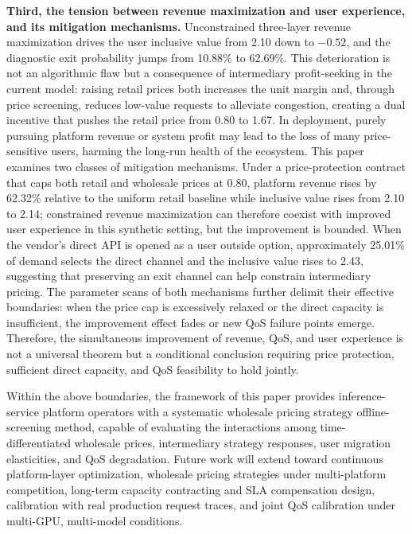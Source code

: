 \documentclass[11pt,a4paper]{article}
\begin{document}
\textbf{Third, the tension between revenue maximization and user experience, and its mitigation mechanisms.} Unconstrained three-layer revenue maximization drives the user inclusive value from 2.10 down to $-0.52$, and the diagnostic exit probability jumps from 10.88\% to 62.69\%. This deterioration is not an algorithmic flaw but a consequence of intermediary profit-seeking in the current model: raising retail prices both increases the unit margin and, through price screening, reduces low-value requests to alleviate congestion, creating a dual incentive that pushes the retail price from 0.80 to 1.67. In deployment, purely pursuing platform revenue or system profit may lead to the loss of many price-sensitive users, harming the long-run health of the ecosystem. This paper examines two classes of mitigation mechanisms. Under a price-protection contract that caps both retail and wholesale prices at 0.80, platform revenue rises by 62.32\% relative to the uniform retail baseline while inclusive value rises from 2.10 to 2.14; constrained revenue maximization can therefore coexist with improved user experience in this synthetic setting, but the improvement is bounded. When the vendor's direct API is opened as a user outside option, approximately 25.01\% of demand selects the direct channel and the inclusive value rises to 2.43, suggesting that preserving an exit channel can help constrain intermediary pricing. The parameter scans of both mechanisms further delimit their effective boundaries: when the price cap is excessively relaxed or the direct capacity is insufficient, the improvement effect fades or new QoS failure points emerge. Therefore, the simultaneous improvement of revenue, QoS, and user experience is not a universal theorem but a conditional conclusion requiring price protection, sufficient direct capacity, and QoS feasibility to hold jointly.

Within the above boundaries, the framework of this paper provides inference-service platform operators with a systematic wholesale pricing strategy offline-screening method, capable of evaluating the interactions among time-differentiated wholesale prices, intermediary strategy responses, user migration elasticities, and QoS degradation. Future work will extend toward continuous platform-layer optimization, wholesale pricing strategies under multi-platform competition, long-term capacity contracting and SLA compensation design, calibration with real production request traces, and joint QoS calibration under multi-GPU, multi-model conditions.
\end{document}
